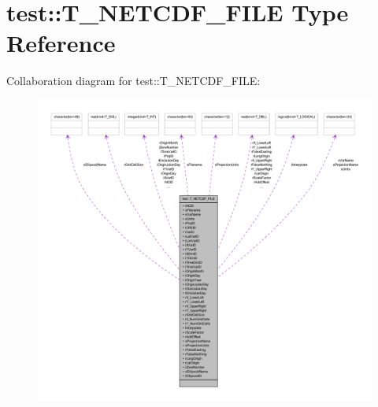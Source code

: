 \hypertarget{typetest_1_1_t___n_e_t_c_d_f___f_i_l_e}{
\section{test::T\_\-NETCDF\_\-FILE Type Reference}
\label{typetest_1_1_t___n_e_t_c_d_f___f_i_l_e}
}


Collaboration diagram for test::T\_\-NETCDF\_\-FILE:\nopagebreak
\begin{figure}[H]
\begin{center}
\leavevmode
\includegraphics[width=400pt]{typetest_1_1_t___n_e_t_c_d_f___f_i_l_e__coll__graph}
\end{center}
\end{figure}
